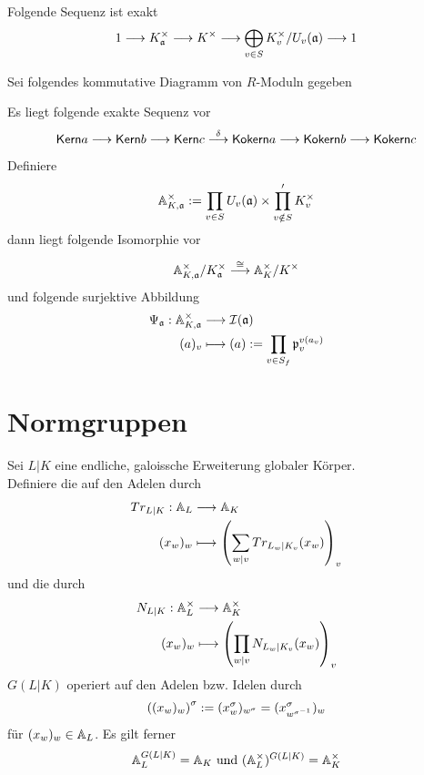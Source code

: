 \Lem{}
Folgende Sequenz ist exakt
\[ 1 \overset{}{\longrightarrow} K_{\mathfrak{a}}^\times \overset{}{\longrightarrow} K^\times \overset{}{\longrightarrow} \bigoplus_{v\in S} K_v^\times/U_v(\mathfrak{a}) \overset{}{\longrightarrow} 1 \]

Sei folgendes kommutative Diagramm von $R$-Moduln gegeben
\begin{center}
\end{center}
Es liegt folgende exakte Sequenz vor
\[ \textsf{Kern} a \overset{}{\longrightarrow} \textsf{Kern} b \overset{}{\longrightarrow} \textsf{Kern} c \overset{\delta}{\longrightarrow} \textsf{Kokern} a \overset{}{\longrightarrow} \textsf{Kokern} b \overset{}{\longrightarrow} \textsf{Kokern} c \]

\Bem{}
Definiere
\[ \mathbb{A}_{K,\mathfrak{a}}^\times := \prod_{v \in S}U_v(\mathfrak{a}) \times \prod'_{v\notin S} K_v^\times \]
dann liegt folgende Isomorphie vor
\[ \mathbb{A}_{K,\mathfrak{a}}^\times / K_{\mathfrak{a}}^\times \overset{\overset{}{\cong}}{\longrightarrow} \mathbb{A}_K^\times / K^\times \]
und folgende surjektive Abbildung
\begin{align*}
\Psi_{\mathfrak{a}} : \mathbb{A}_{K,\mathfrak{a}}^\times &\overset{}{\longrightarrow} \mathcal{I}(\mathfrak{a})\\
(a)_v & \longmapsto (a) := \prod_{v\in S_f}\mathfrak{p}_v^{v(a_v)}
\end{align*}


\section{Normgruppen}
Sei $L|K$ eine endliche, galoissche Erweiterung globaler Körper.\\
Definiere die  auf den Adelen durch
\begin{align*}
Tr_{L|K} : \mathbb{A}_L & \overset{}{\longrightarrow} \mathbb{A}_K\\
(x_w)_w & \longmapsto \left(\sum_{w |v}Tr_{L_w|K_v}(x_w) \right)_v
\end{align*}
und die  durch
\begin{align*}
N_{L|K} : \mathbb{A}_L^\times & \overset{}{\longrightarrow} \mathbb{A}_K^\times\\
(x_w)_w & \longmapsto \left(\prod_{w |v}N_{L_w|K_v}(x_w) \right)_v
\end{align*}
$G(L|K)$ operiert auf den Adelen bzw. Idelen durch
\[ \left((x_w)_w\right)^\sigma := (x_w^\sigma)_{w^\sigma} = (x_{w^{\sigma^{-1}}}^\sigma)_w \]
für $(x_w)_w \in \mathbb{A}_L$. Es gilt ferner
\[ \mathbb{A}_L^{G(L|K)} = \mathbb{A}_K \text{ und } (\mathbb{A}_L^\times)^{G(L|K)} = \mathbb{A}_K^\times \]

